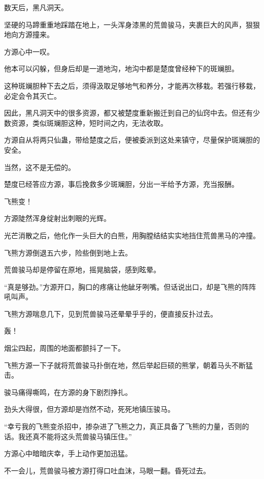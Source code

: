 
\begin{this_body}



数天后，黑凡洞天。

坚硬的马蹄重重地踩踏在地上，一头浑身漆黑的荒兽骏马，夹裹巨大的风声，狠狠地向方源撞来。

方源心中一叹。

他本可以闪躲，但身后却是一道地沟，地沟中都是楚度曾经种下的斑斓胆。

这种斑斓胆种下去之后，须得汲取足够地气和养分，才能再次移栽。若强行移栽，必定会令其灭亡。

因此，黑凡洞天中的很多资源，都又被楚度重新搬迁到自己的仙窍中去。但还有少数资源，类似斑斓胆这种，短时间之内，无法收取。

方源自从将两只仙蛊，带给楚度之后，便被委派到这处来镇守，尽量保护斑斓胆的安全。

当然，这不是无偿的。

楚度已经答应方源，事后挽救多少斑斓胆，分出一半给予方源，充当报酬。

飞熊变！

方源陡然浑身绽射出刺眼的光辉。

光芒消散之后，他化作一头巨大的白熊，用胸膛结结实实地挡住荒兽黑马的冲撞。

飞熊方源倒退五六步，险些倒到地上去。

荒兽骏马却是停留在原地，摇晃脑袋，感到眩晕。

“真是够劲。”方源开口，胸口的疼痛让他龇牙咧嘴。但话说出口，却是飞熊的阵阵吼叫声。

飞熊方源喘息几下，见到荒兽骏马还晕晕乎乎的，便直接反扑过去。

轰！

烟尘四起，周围的地面都颤抖了一下。

飞熊方源一下子就将荒兽骏马扑倒在地，然后举起巨硕的熊掌，朝着马头不断猛击。

骏马痛得嘶鸣，在方源的身下剧烈挣扎。

劲头大得很，但方源却是岿然不动，死死地镇压骏马。

“幸亏我的飞熊变杀招中，掺杂进了飞熊之力，真正具备了飞熊的力量，否则的话。我还真不能将这头荒兽骏马镇压住。”

方源心中暗暗庆幸，手上动作更加迅猛。

不一会儿，荒兽骏马被方源打得口吐血沫，马眼一翻。昏死过去。


\end{this_body}
